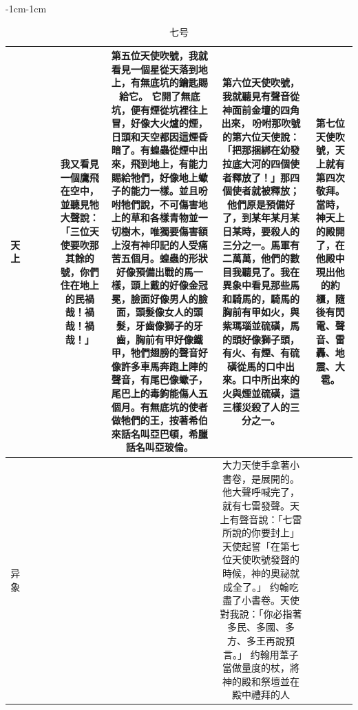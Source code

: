 \begin{changemargin}{-1cm}{-1cm}
\begin{table}
\begin{tabular}{cccccccc}
\multicolumn{1}{m{.3cm}|}{天上}&
\multicolumn{1}{m{1.3cm}|}{}  &
\multicolumn{1}{m{1.3cm}|}{}  &
 \multicolumn{1}{m{1.8cm}|}{} &
 \multicolumn{1}{m{1.8cm}|}{我又看見一個鷹飛在空中，並聽見牠大聲說：「三位天使要吹那其餘的號，你們住在地上的民禍哉！禍哉！禍哉！」}  &
 \multicolumn{1}{m{6cm}|}{第五位天使吹號，我就看見一個星從天落到地上，有無底坑的鑰匙賜給它。 它開了無底坑，便有煙從坑裡往上冒，好像大火爐的煙，日頭和天空都因這煙昏暗了。有蝗蟲從煙中出來，飛到地上，有能力賜給牠們，好像地上蠍子的能力一樣。並且吩咐牠們說，不可傷害地上的草和各樣青物並一切樹木，唯獨要傷害額上沒有神印記的人受痛苦五個月。蝗蟲的形狀好像預備出戰的馬一樣，頭上戴的好像金冠冕，臉面好像男人的臉面，頭髮像女人的頭髮，牙齒像獅子的牙齒，胸前有甲好像鐵甲，牠們翅膀的聲音好像許多車馬奔跑上陣的聲音，有尾巴像蠍子，尾巴上的毒鉤能傷人五個月。有無底坑的使者做牠們的王，按著希伯來話名叫亞巴頓，希臘話名叫亞玻倫。}   &
 \multicolumn{1}{m{8.cm}|}{第六位天使吹號，我就聽見有聲音從神面前金壇的四角出來， 吩咐那吹號的第六位天使說：「把那捆綁在幼發拉底大河的四個使者釋放了！」那四個使者就被釋放；他們原是預備好了，到某年某月某日某時，要殺人的三分之一。馬軍有二萬萬，他們的數目我聽見了。我在異象中看見那些馬和騎馬的，騎馬的胸前有甲如火，與紫瑪瑙並硫磺，馬的頭好像獅子頭，有火、有煙、有硫磺從馬的口中出來。口中所出來的火與煙並硫磺，這三樣災殺了人的三分之一。}  &  
 \multicolumn{1}{m{1.5cm}|}{第七位天使吹號，天上就有第四次敬拜。當時，神天上的殿開了，在他殿中現出他的約櫃，隨後有閃電、聲音、雷轟、地震、大雹。} \\\hline
 \multicolumn{1}{m{.3cm}|}{异象}&
\multicolumn{1}{m{1.3cm}|}{}  &
\multicolumn{1}{m{1.3cm}|}{}  &
 \multicolumn{1}{m{1.8cm}|}{} &
 \multicolumn{1}{m{1.8cm}|}{} &
 \multicolumn{1}{m{6cm}|}{}   &
 \multicolumn{1}{m{8.cm}|}{大力天使手拿著小書卷，是展開的。他大聲呼喊完了，就有七雷發聲。天上有聲音說：「七雷所說的你要封上」 天使起誓「在第七位天使吹號發聲的時候，神的奧祕就成全了。」
约翰吃盡了小書卷。天使對我說：「你必指著多民、多國、多方、多王再說預言。」
约翰用葦子當做量度的杖，將神的殿和祭壇並在殿中禮拜的人}  &  
 \multicolumn{1}{m{1.5cm}|}{} \\\hline
\end{tabular}
\caption{七号}
\end{table} 
\end{changemargin}

 
